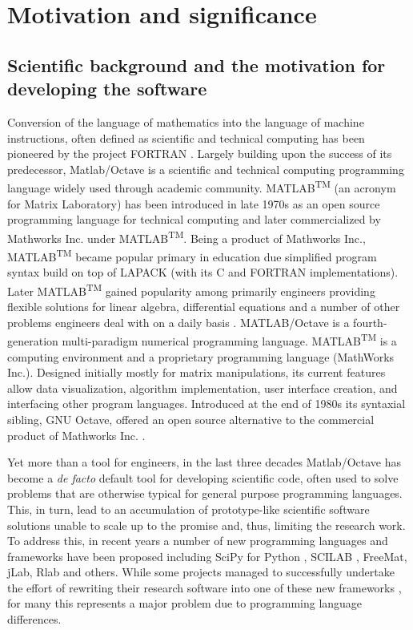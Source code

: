 \section{Motivation and significance}
\subsection{Scientific background and the motivation for developing the software}

Conversion of the language of mathematics into the language of machine instructions, often defined as scientific and technical computing has been pioneered by the project FORTRAN \cite{Backus:1957:FAC}. Largely building upon the success of its predecessor, Matlab/Octave is a scientific and technical computing programming language widely used through academic community. MATLAB\textsuperscript{TM} (an acronym for Matrix Laboratory) has been introduced in late 1970s as an open source programming language for technical computing and later commercialized by Mathworks Inc. under MATLAB\textsuperscript{TM}. Being a product of Mathworks Inc., MATLAB\textsuperscript{TM} became popular primary in education due simplified program syntax build on top of LAPACK (with its C and FORTRAN implementations). Later MATLAB\textsuperscript{TM} gained popularity among primarily engineers providing flexible solutions for linear algebra, differential equations and a number of other problems engineers deal with on a daily basis \cite{moore2014matlab}. MATLAB/Octave is a fourth-generation multi-paradigm numerical programming language. MATLAB\textsuperscript{TM} is a computing environment and a proprietary programming language (MathWorks Inc.). Designed initially mostly for matrix manipulations, its current features allow  data visualization, algorithm implementation, user interface creation, and interfacing other program languages. Introduced at the end of 1980s its syntaxial sibling, GNU Octave, offered an open source alternative to the commercial product of Mathworks Inc. \cite{eaton1997gnu}.

Yet more than a tool for engineers, in the last three decades Matlab/Octave has become a \textit{de facto} default tool for developing scientific code, often used to solve problems that are otherwise typical for general purpose programming languages. This, in turn, lead to an accumulation of prototype-like scientific software solutions unable to scale up to the promise and, thus, limiting the research work. To address this, in recent years a number of new programming languages and frameworks have been proposed including SciPy for Python \cite{jones2001open, Olivier_2002}, SCILAB \cite{Campbell_2009}, FreeMat, jLab, Rlab and others. While some projects managed to successfully undertake the effort of rewriting their research software into one of these new frameworks \cite{17076895, 21349861}, for many this represents a major problem due to programming language differences.

